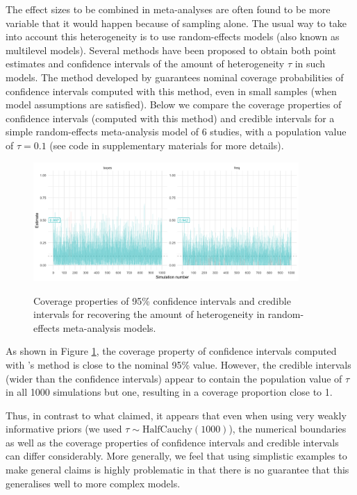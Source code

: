 \documentclass[a4paper,man,natbib,floatsintext,donotrepeattitle]{apa6}
\begin{document}
The effect sizes to be combined in meta-analyses are often found to be more variable that it would happen because of sampling alone. The usual way to take into account this heterogeneity is to use random-effects models (also known as multilevel models). Several methods have been proposed to obtain both point estimates and confidence intervals of the amount of heterogeneity $\tau$ in such models. The method developed by \cite{viechtbauer_confidence_2007} guarantees nominal coverage probabilities of confidence intervals computed with this method, even in small samples (when model assumptions are satisfied). Below we compare the coverage properties of confidence intervals (computed with this method) and credible intervals for a simple random-effects meta-analysis model of 6 studies, with a population value of $\tau = 0.1$ (see code in supplementary materials for more details).

\begin{figure}[H]
  \caption{Coverage properties of 95\% confidence intervals and credible intervals for recovering the amount of heterogeneity in random-effects meta-analysis models.}
  \centering
  \includegraphics[width=0.9\textwidth]{coverage2.png}
  \label{fig:coverage2}
\end{figure}

As shown in Figure \ref{fig:coverage2}, the coverage property of confidence intervals computed with \cite{viechtbauer_confidence_2007}'s method is close to the nominal 95\% value. However, the credible intervals (wider than the confidence intervals) appear to contain the population value of $\tau$ in all 1000 simulations but one, resulting in a coverage proportion close to 1.

Thus, in contrast to what \cite{albers_credible_2018} claimed, it appears that even when using very weakly informative priors (we used $\tau \sim \mathrm{HalfCauchy}(1000)$), the numerical boundaries as well as the coverage properties of confidence intervals and credible intervals can differ considerably. More generally, we feel that using simplistic examples to make general claims is highly problematic in that there is no guarantee that this generalises well to more complex models.
\end{document}
